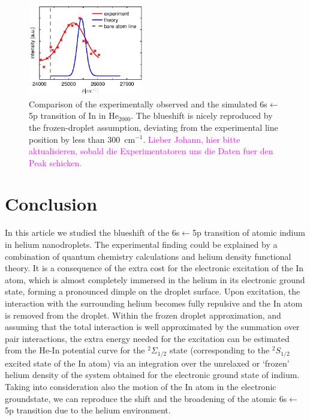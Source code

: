 \documentclass[twoside,twocolumn,9pt]{article}
\def\hl#1{\textcolor{magenta}{#1}}  %
\begin{document}
\begin{figure}[htbp!]
  	\begin{center}
 		\includegraphics[width=0.45\textwidth]{7.eps}
                \caption{Comparison of the experimentally observed and the simulated 6s$\leftarrow{}$5p transition of In in He$_{2000}$. The blueshift is nicely reproduced by the frozen-droplet assumption, deviating from the experimental line position by less than 300~cm$^{-1}$. \hl{Lieber Johann, hier bitte aktualisieren, sobald die Experimentatoren uns die Daten fuer den Peak schicken.} \label{pic:final}}
  	\end{center}
\end{figure}

\section{Conclusion}
In this article we studied the blueshift of the 6s$\leftarrow{}$5p transition of atomic indium in helium nanodroplets. The experimental finding could be explained by a combination of quantum chemistry calculations and helium density functional theory. It is a consequence of the extra cost for the electronic excitation of the In atom, which is almost completely immersed in the helium in its electronic ground state, forming a pronounced dimple on the droplet surface. Upon excitation, the interaction with the surrounding helium becomes fully repulsive and the In atom is removed from the droplet. Within the frozen droplet approximation, and assuming that the total interaction is well approximated by the summation over pair interactions, the extra energy needed for the excitation can be estimated from the He-In potential curve for the  $^2\Sigma_{1/2}$ state (corresponding to the $^2S_{1/2}$ excited state of the In atom) via an integration over the unrelaxed or `frozen' helium density of the system obtained for the electronic ground state of indium. Taking into consideration also the motion of the In atom in the electronic groundstate, we can reproduce the shift and the broadening of the atomic 6s$\leftarrow{}$5p transition due to the helium environment.


\end{document}
